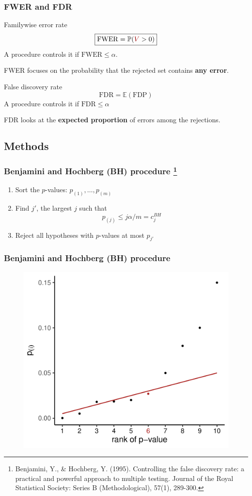 \documentclass[xcolor={dvipsnames}]{beamer}
\newcommand{\bb}[1]{\begin{block}{#1}}
\newcommand{\eb}{\end{block}}
\newcommand{\be}{\begin {enumerate}}
\newcommand{\ee}{\end{enumerate}}
\newcommand{\bfr}[1]{\begin{frame} \frametitle{#1}}
\begin{document}
\bfr{FWER and FDR}

  \bb{Familywise error rate}
   \[ \boxed{\mathrm{FWER} = \mathbb{P}({\color[HTML]{9A0000} V} > 0)} \]
   A procedure controls it if $\text{FWER} \le \alpha$.
   
   FWER focuses on the probability that the rejected set contains \textbf{any error}.
  \eb
  \bb{False discovery rate}
    \[ \boxed{\mathrm{FDR} = \mathbb{E}(\mathrm{FDP})} \]
    A procedure controls it if $\text{FDR} \le \alpha$
    
    FDR looks at the \textbf{expected proportion} of errors among the rejections.
  \eb
\end{frame}



\subsection{Methods}

\bfr{Benjamini and Hochberg (BH) procedure
\footnote{Benjamini, Y., & Hochberg, Y. (1995). Controlling the false discovery rate: a practical and powerful approach to multiple testing. Journal of the Royal Statistical Society: Series B (Methodological), 57(1), 289-300.}}

    \be
      \item Sort the $p$-values: $p_{(1)}, \ldots, p_{(m)}$
      \item Find $j'$, the largest $j$ such that
      \begin{equation*}
\boxed{p_{(j)} \leq j\alpha/m = c_j^{BH}}
      \end{equation*}
      \item Reject all hypotheses with $p$-values at most $p_{j'}$
    \ee
\end{frame}

\bfr{Benjamini and Hochberg (BH) procedure}
\begin{figure}
    \centering
    \includegraphics[width = .7\textwidth]{Slides/MTP/plaatjes/bh.pdf}
\end{figure}
\end{frame}
\end{document}
